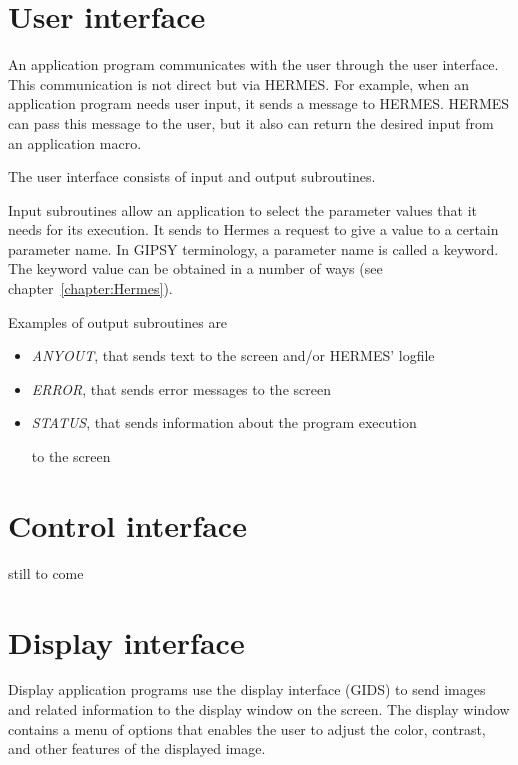 \section{User interface}
\label{sec:SysUserIF}

An application program communicates with the user through the user
interface.  This communication is not direct but via HERMES.  For
example, when an application program needs user input, it sends a
message to HERMES.  HERMES can pass this message to the user, but it
also can return the desired input from an application macro. 

The user interface consists of input and output subroutines. 

Input subroutines allow an application to select the parameter values
that it needs for its execution.  It sends to Hermes a request to give a
value to a certain parameter name.  In GIPSY terminology, a parameter
name is called a keyword.  The keyword value can be obtained in a number
of ways (see chapter~\ref{chapter:Hermes}).

Examples of output subroutines are

\begin{itemize}

\item {\em ANYOUT}, that sends text to the screen and/or HERMES' logfile

\item {\em ERROR}, that sends error messages to the screen

\item {\em STATUS}, that sends information about the program execution 

to the screen 

\end{itemize}

\section{Control interface}
\label{sec:SysControlIF}

still to come

\section{Display interface}
\label{sec:Sys:DisplayIF}

Display application programs use the display interface (GIDS) to send images
and related information to the display window on the screen.  The
display window contains a menu of options that enables the user to
adjust the color, contrast, and other features of the displayed image. 

